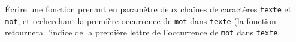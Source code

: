 \exer{}
\setcounter{numques}{0}

Écrire une fonction prenant en paramètre deux chaînes de caractères \texttt{texte} et \texttt{mot}, 
et recherchant la première occurrence de \texttt{mot} dans \texttt{texte} (la fonction retournera 
l'indice de la première lettre de l'occurrence de \texttt{mot} dans \texttt{texte}.
